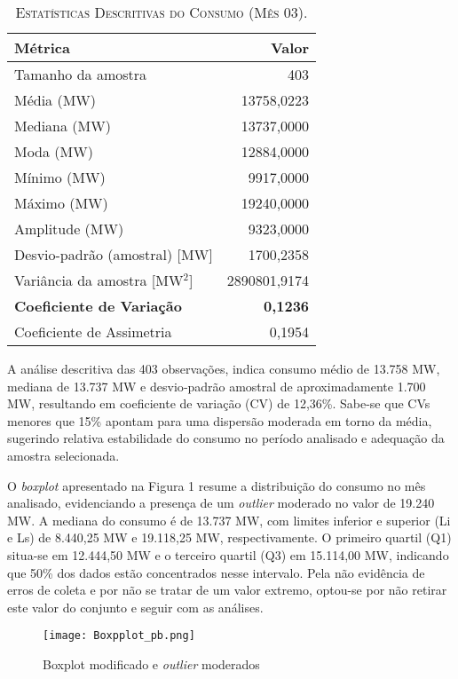 \documentclass[journal]{IEEEtran}
\begin{document}
\begin{table}[!htb]
\centering
\caption{\textsc{Estatísticas Descritivas do Consumo (Mês 03).}}
\label{tab:estatisticas}
\begin{tabular}{l r}
\hline\hline
\textbf{Métrica} & \textbf{Valor} \\
\hline
Tamanho da amostra         & 403 \\
Média (MW)                 & 13758,0223 \\
Mediana (MW)               & 13737,0000 \\
Moda (MW)                  & 12884,0000 \\
Mínimo (MW)                & 9917,0000 \\
Máximo (MW)                & 19240,0000 \\
Amplitude (MW)             & 9323,0000 \\
Desvio-padrão (amostral) [MW] & 1700,2358 \\
Variância da amostra [MW\(^2\)] & 2890801,9174 \\
\textbf{Coeficiente de Variação} & \textbf{0,1236} \\
Coeficiente de Assimetria  & 0,1954 \\
\hline\hline
\end{tabular}
\end{table}

A análise descritiva das 403 observações, indica consumo médio de 13.758 MW, mediana de 13.737 MW e desvio‑padrão amostral de aproximadamente 1.700 MW, resultando em coeficiente de variação (CV) de 12,36\%. Sabe-se que CVs menores que 15\% apontam para uma dispersão moderada em torno da média, sugerindo relativa estabilidade do consumo no período analisado e adequação da amostra selecionada.

O \emph{boxplot} apresentado na Figura 1 resume a distribuição do consumo no mês analisado, evidenciando a presença de um \emph{outlier} moderado no valor de 19.240 MW. A mediana do consumo é de 13.737 MW, com limites inferior e superior (Li e Ls) de 8.440,25 MW e 19.118,25 MW, respectivamente. O primeiro quartil (Q1) situa-se em 12.444,50 MW e o terceiro quartil (Q3) em 15.114,00 MW, indicando que 50\% dos dados estão concentrados nesse intervalo. Pela não evidência de erros de coleta e por não se tratar de um valor extremo, optou-se por não retirar este valor do conjunto e seguir com as análises.

\begin{figure}[!htb]
    \centering
    \texttt{[image: Boxpplot\_pb.png]}
    \caption{Boxplot modificado e \emph{outlier} moderados}
    \label{fig:boxplot_consumo}
\end{figure}
\end{document}
